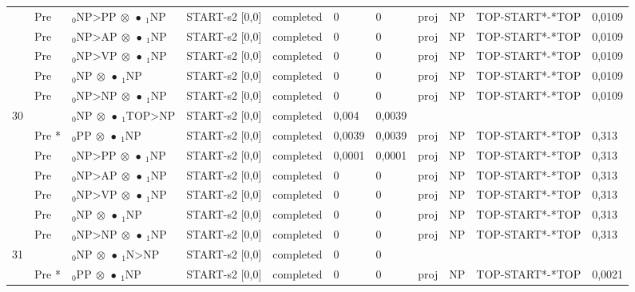 \documentclass[10pt]{article}
\begin{document}
\begin{longtable}[htbp]{lllllllllll}
 & Pre & $ {}_0 \textrm{NP>PP} \  \otimes \  \bullet \ {}_{1} \textrm{NP} $ & START-s2 [0,0] & completed & 0 & 0 & proj & NP & TOP-START*-*TOP & 0,0109 \\ 
 & Pre & $ {}_0 \textrm{NP>AP} \  \otimes \  \bullet \ {}_{1} \textrm{NP} $ & START-s2 [0,0] & completed & 0 & 0 & proj & NP & TOP-START*-*TOP & 0,0109 \\ 
 & Pre & $ {}_0 \textrm{NP>VP} \  \otimes \  \bullet \ {}_{1} \textrm{NP} $ & START-s2 [0,0] & completed & 0 & 0 & proj & NP & TOP-START*-*TOP & 0,0109 \\ 
 & Pre & $ {}_0 \textrm{NP} \  \otimes \  \bullet \ {}_{1} \textrm{NP} $ & START-s2 [0,0] & completed & 0 & 0 & proj & NP & TOP-START*-*TOP & 0,0109 \\ 
 & Pre & $ {}_0 \textrm{NP>NP} \  \otimes \  \bullet \ {}_{1} \textrm{NP} $ & START-s2 [0,0] & completed & 0 & 0 & proj & NP & TOP-START*-*TOP & 0,0109 \\ 
30 & & $ {}_0 \textrm{NP} \  \otimes \  \bullet \ {}_{1} \textrm{TOP>NP} $ & START-s2 [0,0] & completed & 0,004 & 0,0039 & & & & \\ 
 & Pre *& $ {}_0 \textrm{PP} \  \otimes \  \bullet \ {}_{1} \textrm{NP} $ & START-s2 [0,0] & completed & 0,0039 & 0,0039 & proj & NP & TOP-START*-*TOP & 0,313 \\ 
 & Pre & $ {}_0 \textrm{NP>PP} \  \otimes \  \bullet \ {}_{1} \textrm{NP} $ & START-s2 [0,0] & completed & 0,0001 & 0,0001 & proj & NP & TOP-START*-*TOP & 0,313 \\ 
 & Pre & $ {}_0 \textrm{NP>AP} \  \otimes \  \bullet \ {}_{1} \textrm{NP} $ & START-s2 [0,0] & completed & 0 & 0 & proj & NP & TOP-START*-*TOP & 0,313 \\ 
 & Pre & $ {}_0 \textrm{NP>VP} \  \otimes \  \bullet \ {}_{1} \textrm{NP} $ & START-s2 [0,0] & completed & 0 & 0 & proj & NP & TOP-START*-*TOP & 0,313 \\ 
 & Pre & $ {}_0 \textrm{NP} \  \otimes \  \bullet \ {}_{1} \textrm{NP} $ & START-s2 [0,0] & completed & 0 & 0 & proj & NP & TOP-START*-*TOP & 0,313 \\ 
 & Pre & $ {}_0 \textrm{NP>NP} \  \otimes \  \bullet \ {}_{1} \textrm{NP} $ & START-s2 [0,0] & completed & 0 & 0 & proj & NP & TOP-START*-*TOP & 0,313 \\ 
31 & & $ {}_0 \textrm{NP} \  \otimes \  \bullet \ {}_{1} \textrm{N>NP} $ & START-s2 [0,0] & completed & 0 & 0 & & & & \\ 
 & Pre *& $ {}_0 \textrm{PP} \  \otimes \  \bullet \ {}_{1} \textrm{NP} $ & START-s2 [0,0] & completed & 0 & 0 & proj & NP & TOP-START*-*TOP & 0,0021 \\ 

\end{longtable}
\end{document}

